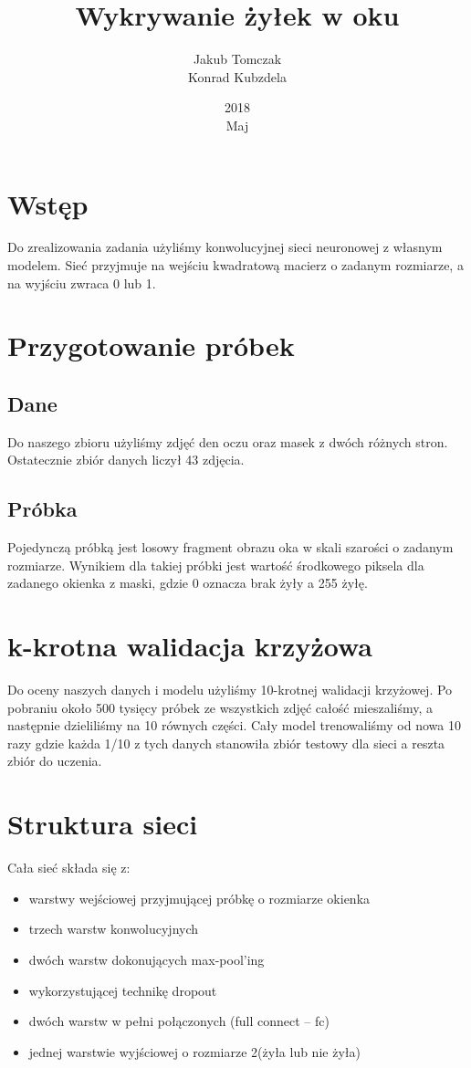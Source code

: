 \documentclass{article}
\title{Wykrywanie żyłek w oku}
\date{2018\\ Maj}
\author{Jakub Tomczak \\ Konrad Kubzdela}
\begin{document}
\maketitle
\clearpage
\section{Wstęp}
Do zrealizowania zadania użyliśmy konwolucyjnej sieci neuronowej z własnym  modelem. Sieć przyjmuje na wejściu kwadratową macierz o zadanym rozmiarze, a na wyjściu zwraca 0 lub 1.
\section{Przygotowanie próbek}
\subsection{Dane}
Do naszego zbioru użyliśmy zdjęć den oczu oraz masek z dwóch różnych stron. Ostatecznie zbiór danych liczył 43 zdjęcia.
\subsection{Próbka}
Pojedynczą próbką jest losowy fragment obrazu oka w skali szarości o zadanym rozmiarze. Wynikiem dla takiej próbki jest wartość środkowego piksela dla zadanego okienka z maski, gdzie 0 oznacza brak żyły a 255 żyłę.  
\section{k-krotna walidacja krzyżowa}

Do oceny naszych danych i modelu użyliśmy 10-krotnej walidacji krzyżowej. Po pobraniu około 500 tysięcy próbek ze wszystkich zdjęć całość mieszaliśmy, a następnie dzieliliśmy na 10 równych części. 
Cały model trenowaliśmy od nowa 10 razy gdzie każda 1/10 z tych danych stanowiła zbiór testowy dla sieci a reszta zbiór do uczenia.

\section{Struktura sieci}
Cała sieć składa się z:
\begin{itemize}
  \item warstwy wejściowej przyjmującej próbkę o rozmiarze okienka
  \item trzech warstw konwolucyjnych
  \item dwóch warstw dokonujących max-pool’ing 
  \item wykorzystującej technikę dropout 
 \item dwóch warstw w pełni połączonych (full connect – fc)
  \item jednej warstwie wyjściowej o rozmiarze 2(żyła lub nie żyła)
\end{itemize}
\end{document}
